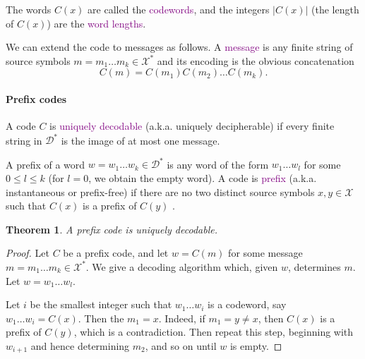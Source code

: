 \documentclass[a4paper, 11pt]{article}
\numberwithin{equation}{section}
\theoremstyle{plain}
\newtheorem{theorem}	[equation]	{Theorem}
\theoremstyle{definition}
\newcommand{\Define}[1]{\textcolor{purple}{#1}}
\begin{document}
The words $C(x)$ are called the \Define{codewords}, and the integers $|C(x)|$ (the length of $C(x)$) are the \Define{word lengths}.

We can extend the code to messages as follows. A \Define{message} is any finite string of source symbols $m = m_1 \dots m_k \in \mathcal{X}^*$ and its encoding is the obvious concatenation 
\[
    C(m) = C(m_1) C(m_2) \dots C(m_k).
\]

\paragraph{Prefix codes}


A code $C$ is \Define{uniquely decodable} (a.k.a. uniquely decipherable) if every finite string in $\mathcal{D}^*$ is the image of at most one message. 

A prefix of a word $w = w_1 \dots w_k \in \mathcal{D}^*$ is any word of the form $w_1 \dots w_l$ for some $0 \le l \le k$ (for $l=0$, we obtain the empty word). A code is \Define{prefix} (a.k.a. instantaneous or prefix-free) if there are no two distinct source symbols $x, y \in \mathcal{X}$ such that $C(x)$ is a prefix of  $C(y)$         .

\begin{theorem}
A prefix code is uniquely decodable.
\end{theorem}

\begin{proof}
Let $C$ be a prefix code, and let $w = C(m)$ for some message $m = m_1 \dots m_k \in \mathcal{X}^*$. We give a decoding algorithm which, given $w$, determines $m$. Let $w = w_1 \dots w_l$.

Let $i$ be the smallest integer such that $w_1 \dots w_i$ is a codeword, say $w_1 \dots w_i = C(x)$. Then the $m_1 = x$. Indeed, if $m_1 = y \ne x$, then $C(x)$ is a prefix of $C(y)$, which is a contradiction. Then repeat this step, beginning with $w_{i+1}$ and hence determining $m_2$, and so on until $w$ is empty.
\end{proof}
\end{document}
